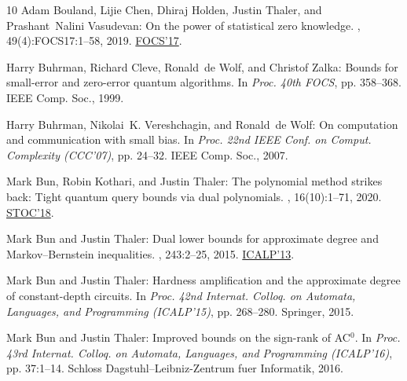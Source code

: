 \documentclass[11pt]{article}
\numberwithin{equation}{section}
\theoremstyle{definition}
\theoremstyle{plain}
\begin{document}
\begin{thebibliography}{10}
{\sc Adam Bouland, Lijie Chen, Dhiraj Holden, Justin Thaler, and
  Prashant~Nalini Vasudevan}: On the power of statistical zero knowledge.
, 49(4):FOCS17:1--58, 2019.
\newblock \prelim \href{https://doi.org/10.1109/FOCS.2017.71}{FOCS'17}.

{\sc Harry Buhrman, Richard Cleve, Ronald~de Wolf, and Christof Zalka}: Bounds
  for small-error and zero-error quantum algorithms.
\newblock In {\em Proc. 40th FOCS}, pp. 358--368. IEEE Comp. Soc., 1999.

{\sc Harry Buhrman, Nikolai~K. Vereshchagin, and Ronald~de Wolf}: On
  computation and communication with small bias.
\newblock In {\em Proc. 22nd IEEE Conf. on Comput. Complexity (CCC'07)}, pp.
  24--32. IEEE Comp. Soc., 2007.

{\sc Mark Bun, Robin Kothari, and Justin Thaler}: The polynomial method strikes
  back: {T}ight quantum query bounds via dual polynomials.
, 16(10):1--71, 2020.
\newblock \prelim \href{https://doi.org/10.1145/3188745.3188784}{STOC'18}.

{\sc Mark Bun and Justin Thaler}: Dual lower bounds for approximate degree and
  {M}arkov--{B}ernstein inequalities.
, 243:2--25, 2015.
\newblock \prelim
  \href{https://doi.org/10.1007/978-3-642-39206-1\_26}{ICALP'13}.
\newblock [\epfmtdoi{10.1016/j.ic.2014.12.003}]

{\sc Mark Bun and Justin Thaler}: Hardness amplification and the approximate
  degree of constant-depth circuits.
\newblock In {\em Proc. 42nd Internat. Colloq. on Automata, Languages, and
  Programming (ICALP'15)}, pp. 268--280. Springer, 2015.

{\sc Mark Bun and Justin Thaler}: Improved bounds on the sign-rank of {AC}$^0$.
\newblock In {\em Proc. 43rd Internat. Colloq. on Automata, Languages, and
  Programming (ICALP'16)}, pp. 37:1--14. Schloss Dagstuhl--Leibniz-Zentrum fuer
  Informatik, 2016.


\end{thebibliography}
\end{document}
